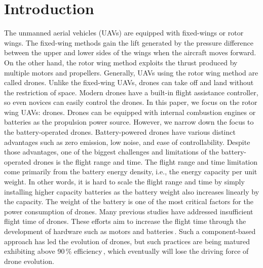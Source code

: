 \documentclass[journal]{./template/IEEEtran}
\begin{document}
\section{Introduction}
\label{Section: introduction}

The unmanned aerial vehicles (UAVs) are equipped with fixed-wings or rotor wings.
The fixed-wing methods gain the lift generated by the pressure difference between the upper and lower sides of the wings when the aircraft moves forward. 
On the other hand, the rotor wing method exploits the thrust produced by multiple motors and propellers. Generally, UAVs using the rotor wing method are called drones. Unlike the fixed-wing UAVs, drones can take off and land without the restriction of space. 
Modern drones have a built-in flight assistance controller, so even novices can easily control the drones. 
In this paper, we focus on the rotor wing UAVs: drones. 
Drones can be equipped with internal combustion engines or batteries as the propulsion power source. However, we narrow down the focus to the battery-operated drones.
Battery-powered drones have various distinct advantages such as zero emission, low noise, and ease of controllability.
Despite those advantages, one of the biggest challenges and limitations of the battery-operated drones is the flight range and time. 
The flight range and time limitation come primarily from the battery energy density, i.e., the energy capacity per unit weight.
In other words, it is hard to scale the flight range and time by simply installing higher capacity batteries as the battery weight also increases linearly by the capacity. 
The weight of the battery is one of the most critical factors for the power consumption of drones. 
Many previous studies have addressed insufficient flight time of drones. 
These efforts aim to increase the flight time through the development of hardware such as motors and batteries\,\cite{ref_1}.
Such a component-based approach has led the evolution of drones, but such practices are being matured exhibiting above 90\,\% efficiency\,\cite{ref_2}, which eventually will lose the driving force of drone evolution. 
\end{document}
